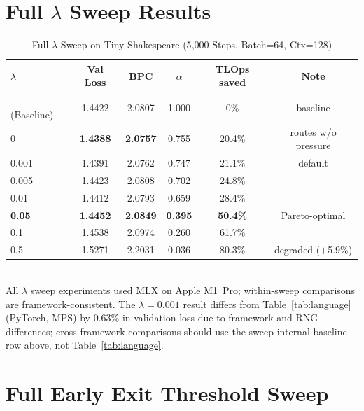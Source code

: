 \documentclass{article}
\begin{document}
\section{Full $\lambda$ Sweep Results}
\label{app:lambda}

\begin{table}[h]
\centering
\caption{Full $\lambda$ Sweep on Tiny-Shakespeare (5{,}000 Steps, Batch=64, Ctx=128)}
\label{tab:lambda_full}
\small
\begin{tabular}{lccccc}
\toprule
$\lambda$ & Val Loss & BPC & $\alpha$ & TLOps saved & Note \\
\midrule
--- (Baseline) & 1.4422 & 2.0807 & 1.000 & 0\% & baseline \\
0        & \textbf{1.4388} & \textbf{2.0757} & 0.755 & 20.4\% & routes w/o pressure \\
0.001    & 1.4391 & 2.0762 & 0.747 & 21.1\% & default \\
0.005    & 1.4423 & 2.0808 & 0.702 & 24.8\% & \\
0.01     & 1.4412 & 2.0793 & 0.659 & 28.4\% & \\
\textbf{0.05} & \textbf{1.4452} & \textbf{2.0849} & \textbf{0.395} & \textbf{50.4\%} & Pareto-optimal \\
0.1      & 1.4538 & 2.0974 & 0.260 & 61.7\% & \\
0.5      & 1.5271 & 2.2031 & 0.036 & 80.3\% & degraded ($+$5.9\%) \\
\bottomrule
\end{tabular}
\\[3pt]
{\footnotesize All $\lambda$ sweep experiments used MLX on Apple M1~Pro;
within-sweep comparisons are framework-consistent. The $\lambda{=}0.001$ result
differs from Table~\ref{tab:language} (PyTorch, MPS) by 0.63\% in validation loss
due to framework and RNG differences; cross-framework comparisons should use the
sweep-internal baseline row above, not Table~\ref{tab:language}.}
\end{table}

\section{Full Early Exit Threshold Sweep}
\label{app:early_exit}
\end{document}
